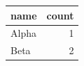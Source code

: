 \documentclass{article}
\begin{document}
\begin{tabular}{|l|r|}
\hline
name & count \\
\hline
Alpha & 1 \\
Beta & 2 \\
\hline
\end{tabular}
\end{document}
